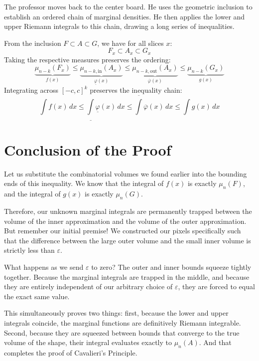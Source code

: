 \begin{ai-note}
The professor moves back to the center board. He uses the geometric inclusion to establish an ordered chain of marginal densities. He then applies the lower and upper Riemann integrals to this chain, drawing a long series of inequalities.
\end{ai-note}

\begin{math-stroke}
From the inclusion $F \subset A \subset G$, we have for all slices $x$:
\[
F_x \subset A_x \subset G_x
\]
Taking the respective measures preserves the ordering:
\[
\underbrace{\mu_{n-k}(F_x)}_{f(x)} \le \underbrace{\mu_{n-k,\text{in}}(A_x)}_{\underline{\varphi}(x)} \le \underbrace{\mu_{n-k,\text{out}}(A_x)}_{\overline{\varphi}(x)} \le \underbrace{\mu_{n-k}(G_x)}_{g(x)}
\]
Integrating across $[-c, c]^k$ preserves the inequality chain:
\[
\int f(x) \, dx \le \underline{\int} \underline{\varphi}(x) \, dx \le \overline{\int} \overline{\varphi}(x) \, dx \le \int g(x) \, dx
\]
\end{math-stroke}

\section{Conclusion of the Proof}

\begin{spoken-clean}[27:30 - 30:42]
Let us substitute the combinatorial volumes we found earlier into the bounding ends of this inequality. We know that the integral of $f(x)$ is exactly $\mu_n(F)$, and the integral of $g(x)$ is exactly $\mu_n(G)$. 

Therefore, our unknown marginal integrals are permanently trapped between the volume of the inner approximation and the volume of the outer approximation. But remember our initial premise! We constructed our pixels specifically such that the difference between the large outer volume and the small inner volume is strictly less than $\varepsilon$. 

What happens as we send $\varepsilon$ to zero? The outer and inner bounds squeeze tightly together. Because the marginal integrals are trapped in the middle, and because they are entirely independent of our arbitrary choice of $\varepsilon$, they are forced to equal the exact same value. 

This simultaneously proves two things: first, because the lower and upper integrals coincide, the marginal functions are definitively Riemann integrable. Second, because they are squeezed between bounds that converge to the true volume of the shape, their integral evaluates exactly to $\mu_n(A)$. And that completes the proof of Cavalieri's Principle.
\end{spoken-clean}

